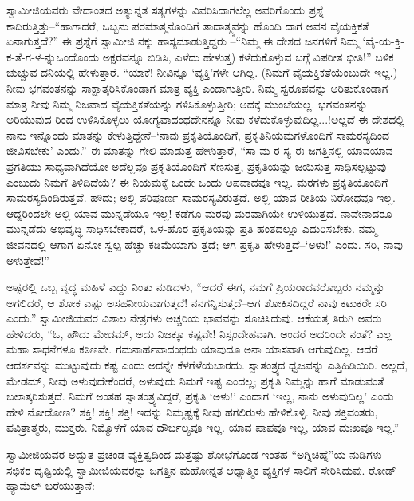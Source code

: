 ಸ್ವಾಮೀಜಿಯವರು ವೇದಾಂತದ ಅತ್ಯುನ್ನತ ಸತ್ಯಗಳನ್ನು ವಿವರಿಸಿದಾಗಲೆಲ್ಲ ಅವರಿಗೊಂದು ಪ್ರಶ್ನೆ ಕಾದಿರುತ್ತಿತ್ತು–“ಹಾಗಾದರೆ, ಒಬ್ಬನು ಪರಮಾತ್ಮನೊಂದಿಗೆ ತಾದಾತ್ಮ್ಯವನ್ನು ಹೊಂದಿ ದಾಗ ಅವನ ವೈಯಕ್ತಿಕತೆ ಏನಾಗುತ್ತದೆ?” ಈ ಪ್ರಶ್ನೆಗೆ ಸ್ವಾಮೀಜಿ ನಕ್ಕು ಹಾಸ್ಯಮಾಡುತ್ತಿದ್ದರು –“ನಿಮ್ಮ ಈ ದೇಶದ ಜನಗಳಿಗೆ ನಿಮ್ಮ ‘ವೈ-ಯ-ಕ್ತಿ-ಕ-ತೆ-ಗ-ಳ-ನ್ನುಒಂದೊಂದು ಅಕ್ಷರವನ್ನೂ ಬಿಡಿಸಿ, ಎಳೆದು ಹೇಳುತ್ತ) ಕಳೆದುಕೊಳ್ಳುವ ಬಗ್ಗೆ ವಿಪರೀತ ಭೀತಿ!” ಬಳಿಕ ಚುಚ್ಚುವ ದನಿಯಲ್ಲಿ ಹೇಳುತ್ತಾರೆ. “ಯಾಕೆ! ನೀವಿನ್ನೂ ‘ವ್ಯಕ್ತಿ’ಗಳೇ ಆಗಿಲ್ಲ. (ನಿಮಗೆ ವೈಯಕ್ತಿಕತೆಯೆಂಬುದೇ ಇಲ್ಲ.) ನೀವು ಭಗವಂತನನ್ನು ಸಾಕ್ಷಾತ್ಕರಿಸಿಕೊಂಡಾಗ ಮಾತ್ರ ವ್ಯಕ್ತಿ ಎಂದಾಗುತ್ತೀರಿ. ನಿಮ್ಮ ಸ್ವರೂಪವನ್ನು ಅರಿತುಕೊಂಡಾಗ ಮಾತ್ರ ನೀವು ನಿಮ್ಮ ನಿಜವಾದ ವೈಯಕ್ತಿಕತೆಯನ್ನು ಗಳಿಸಿಕೊಳ್ಳುತ್ತೀರಿ; ಅದಕ್ಕೆ ಮುಂಚೆಯಲ್ಲ. ಭಗವಂತನನ್ನು ಅರಿಯುವುದ ರಿಂದ ಉಳಿಸಿಕೊಳ್ಳಲು ಯೋಗ್ಯವಾದಂಥದೇನನ್ನೂ ನೀವು ಕಳೆದುಕೊಳ್ಳುವುದಿಲ್ಲ...!ಅಲ್ಲದೆ ಈ ದೇಶದಲ್ಲಿ ನಾನು ಇನ್ನೊಂದು ಮಾತನ್ನು ಕೇಳುತ್ತಿದ್ದೇನೆ–‘ನಾವು ಪ್ರಕೃತಿಯೊಂದಿಗೆ, ಪ್ರಕೃತಿನಿಯಮಗಳೊಂದಿಗೆ ಸಾಮರಸ್ಯದಿಂದ ಜೀವಿಸಬೇಕು’ ಎಂದು.” ಈ ಮಾತನ್ನು ಗೇಲಿ ಮಾಡುತ್ತ ಹೇಳುತ್ತಾರೆ, “ಸಾ-ಮ-ರ-ಸ್ಯ  ಈ ಜಗತ್ತಿನಲ್ಲಿ ಯಾವಯಾವ ಪ್ರಗತಿಯು ಸಾಧ್ಯವಾಗಿದೆಯೋ ಅದೆಲ್ಲವೂ ಪ್ರಕೃತಿಯೊಂದಿಗೆ ಸೆಣಸುತ್ತ, ಪ್ರಕೃತಿಯನ್ನು ಜಯಿಸುತ್ತ ಸಾಧಿಸಲ್ಪಟ್ಟುವು ಎಂಬುದು ನಿಮಗೆ ತಿಳಿದಿದೆಯೆ? ಈ ನಿಯಮಕ್ಕೆ ಒಂದೇ ಒಂದು ಅಪವಾದವೂ ಇಲ್ಲ. ಮರಗಳು ಪ್ರಕೃತಿಯೊಂದಿಗೆ ಸಾಮರಸ್ಯದಿಂದಿರುತ್ತವೆ. ಹೌದು; ಅಲ್ಲಿ ಪರಿಪೂರ್ಣ ಸಾಮರಸ್ಯವಿರುತ್ತದೆ. ಅಲ್ಲಿ ಯಾವ ರೀತಿಯ ನಿರೋಧವೂ ಇಲ್ಲ. ಆದ್ದರಿಂದಲೇ ಅಲ್ಲಿ ಯಾವ ಮುನ್ನಡೆಯೂ ಇಲ್ಲ! ಕಡೆಗೂ ಮರವು ಮರವಾಗಿಯೇ ಉಳಿಯುತ್ತದೆ. ನಾವೇನಾದರೂ ಮುನ್ನಡೆದು ಅಭಿವೃದ್ಧಿ ಸಾಧಿಸಬೇಕಾದರೆ, ಒಳ-ಹೊರ ಪ್ರಕೃತಿಯನ್ನು ಪ್ರತಿ ಹಂತದಲ್ಲೂ ಎದುರಿಸಬೇಕು. ನಮ್ಮ ಜೀವನದಲ್ಲಿ ಆಗಾಗ ಏನೋ ಸ್ವಲ್ಪ ಹೆಚ್ಚು ಕಡಿಮೆಯಾಗು ತ್ತದೆ; ಆಗ ಪ್ರಕೃತಿ ಹೇಳುತ್ತದೆ–‘ಅಳು!’ ಎಂದು. ಸರಿ, ನಾವು ಅಳುತ್ತೇವೆ!”

ಅಷ್ಟರಲ್ಲಿ ಒಬ್ಬ ವೃದ್ಧ ಮಹಿಳೆ ಎದ್ದು ನಿಂತು ನುಡಿದಳು, “ಆದರೆ ಈಗ, ನಮಗೆ ಪ್ರಿಯರಾದವರೊಬ್ಬರು ನಮ್ಮನ್ನು ಅಗಲಿದರೆ, ಆ ಶೋಕ ಎಷ್ಟು ಅಸಹನೀಯವಾಗುತ್ತದೆ! ನನಗನ್ನಿಸುತ್ತದೆ–ಆಗ ಶೋಕಿಸದಿದ್ದರೆ ನಾವು ಕಟುಕರೇ ಸರಿ ಎಂದು.” ಸ್ವಾಮೀಜಿಯವರ ವಿಶಾಲ ನೇತ್ರಗಳು ಅಚ್ಚರಿಯ ಭಾವವನ್ನು ಸೂಚಿಸಿದುವು. ಆಕೆಯತ್ತ ತಿರುಗಿ ಅವರು ಹೇಳಿದರು, “ಓ, ಹೌದು ಮೇಡಮ್, ಅದು ನಿಜಕ್ಕೂ ಕಷ್ಟವೇ! ನಿಸ್ಸಂದೇಹವಾಗಿ. ಅಂದರೆ ಅದರಿಂದೇ ನಂತೆ? ಎಲ್ಲ ಮಹಾ ಸಾಧನೆಗಳೂ ಕಠಿಣವೇ. ಗಮನಾರ್ಹವಾದಂಥದು ಯಾವುದೂ ಅನಾ ಯಾಸವಾಗಿ ಆಗುವುದಿಲ್ಲ. ಆದರೆ ಆದರ್ಶವನ್ನು ಮುಟ್ಟುವುದು ಕಷ್ಟ ಎಂದು ಅದನ್ನೇ ಕೆಳಗೆಳೆಯಬಾರದು. ಸ್ವಾತಂತ್ರ್ಯದ ಧ್ವಜವನ್ನು ಎತ್ತಿಹಿಡಿಯಿರಿ. ಅಲ್ಲದೆ, ಮೇಡಮ್, ನೀವು ಅಳುವುದೇಕೆಂದರೆ, ಅಳುವುದು ನಿಮಗೆ ಇಷ್ಟ ಎಂದಲ್ಲ; ಪ್ರಕೃತಿ ನಿಮ್ಮನ್ನು ಹಾಗೆ ಮಾಡುವಂತೆ ಬಲಾತ್ಕರಿಸುತ್ತದೆ. ನಿಮಗೆ ಅಂತಹ ಸ್ವಾತಂತ್ರ್ಯವಿದ್ದರೆ, ಪ್ರಕೃತಿ ‘ಅಳು!’ ಎಂದಾಗ ‘ಇಲ್ಲ, ನಾನು ಅಳುವುದಿಲ್ಲ’ ಎಂದು ಹೇಳಿ ನೋಡೋಣ? ಶಕ್ತಿ! ಶಕ್ತಿ! ಶಕ್ತಿ! ಇದನ್ನು ನಿಮ್ಮಷ್ಟಕ್ಕೆ ನೀವು ಹಗಲಿರುಳು ಹೇಳಿಕೊಳ್ಳಿ. ನೀವು ಶಕ್ತಿವಂತರು, ಪವಿತ್ರಾತ್ಮರು, ಮುಕ್ತರು. ನಿಮ್ಮೊಳಗೆ ಯಾವ ದೌರ್ಬಲ್ಯವೂ ಇಲ್ಲ. ಯಾವ ಪಾಪವೂ ಇಲ್ಲ, ಯಾವ ದುಃಖವೂ ಇಲ್ಲ.”

ಸ್ವಾಮೀಜಿಯವರ ಅದ್ಭುತ ಪ್ರಚಂಡ ವ್ಯಕ್ತಿತ್ವದಿಂದ ಮತ್ತಷ್ಟು ಶೋಭೆಗೊಂಡ ಇಂತಹ “ಅಗ್ನಿಚಿಹ್ನೆ”ಯ ನುಡಿಗಳು ಸಭಿಕರ ದೃಷ್ಟಿಯಲ್ಲಿ ಸ್ವಾಮೀಜಿಯವರನ್ನು ಜಗತ್ತಿನ ಮಹೋನ್ನತ ಆಧ್ಯಾತ್ಮಿಕ ವ್ಯಕ್ತಿಗಳ ಸಾಲಿಗೆ ಸೇರಿಸಿದುವು. ರೋಡ್​ಹ್ಯಾಮೆಲ್ ಬರೆಯುತ್ತಾನೆ:

